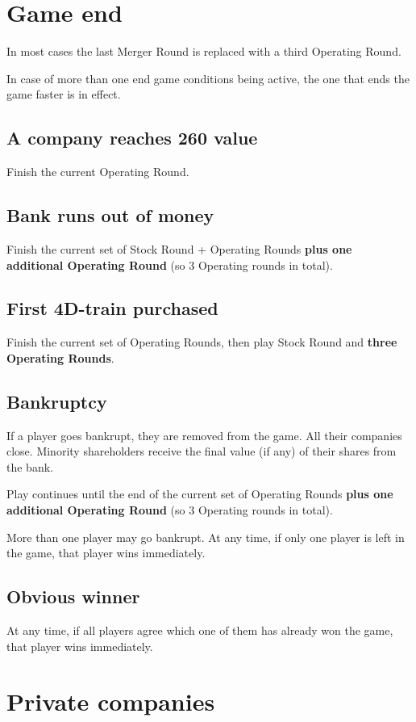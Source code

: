 \documentclass[10pt,a4paper,twocolumn]{article}
\begin{document}
\section{Game end}

In most cases the last Merger Round is replaced with a third Operating Round.

In case of more than one end game conditions being active, the one that ends the game faster is in effect.

\subsection{A company reaches 260 value}
Finish the current Operating Round.

\subsection{Bank runs out of money}
Finish the current set of Stock Round + Operating Rounds \textbf{plus one additional Operating Round} (so 3 Operating rounds in total).

\subsection{First 4D-train purchased}
Finish the current set of Operating Rounds, then play Stock Round and \textbf{three Operating Rounds}.

\subsection{Bankruptcy}
If a player goes bankrupt, they are removed from the game. All their companies close. Minority shareholders receive the final value (if any) of their shares from the bank.

Play continues until the end of the current set of Operating Rounds \textbf{plus one additional Operating Round} (so 3 Operating rounds in total). 

More than one player may go bankrupt. At any time, if only one player is left in the game, that player wins immediately.

\subsection{Obvious winner}
At any time, if all players agree which one of them has already won the game, that player wins immediately.

\section{Private companies}
\end{document}
